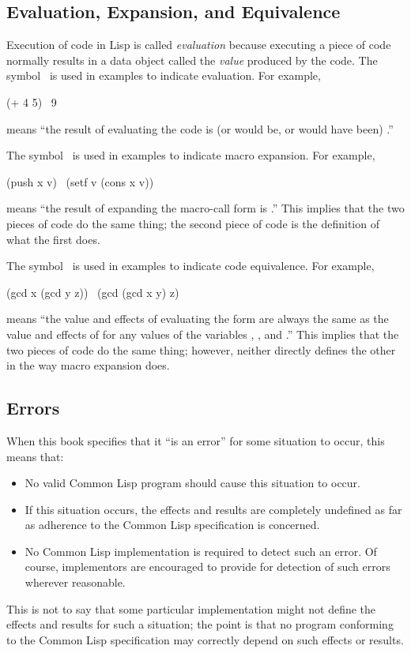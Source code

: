 \subsection{Evaluation, Expansion, and Equivalence}

Execution of code in Lisp is called \emph{evaluation} because executing a
piece of code normally results in a data object called the \emph{value}
produced by the code.  The symbol \EV\ is used in examples to
indicate evaluation.
For example,
\begin{lisp}
(+ 4 5) \EV\ 9
\end{lisp}
means ``the result of evaluating the code  is (or would be,
or would have been) .'' 

The symbol \EX\ is used in examples to indicate macro expansion.
For example,
\begin{lisp}
(push x v) \EX\ (setf v (cons x v))
\end{lisp}
means ``the result of expanding the macro-call form 
is .''  This implies that the two pieces
of code do the same thing; the second piece of code is
the definition of what the first does.

The symbol \EQ\ is used in examples to indicate code equivalence.
For example,
\begin{lisp}
(gcd x (gcd y z)) \EQ\ (gcd (gcd x y) z)
\end{lisp}
means ``the value and effects of evaluating the form
 are always the same as the value
and effects of
 for any values of the
variables , , and .''
This implies that the two pieces
of code do the same thing; however, neither directly defines
the other in the way macro expansion does.

\subsection{Errors}
\label{INTRO-ERRORS}

When this book specifies that it ``is an error'' for some situation
to occur, this means that:

\begin{itemize}
\item No valid Common Lisp program should cause this situation to occur.

\item If this situation occurs, the effects and results are completely
undefined as far as adherence to the Common Lisp specification is concerned.

\item No Common Lisp implementation is required to detect such an error.
Of course, implementors are encouraged to provide for detection
of such errors wherever reasonable.
\end{itemize}
This is not to say that some particular implementation might not define
the effects and results for such a situation; the point is that no program
conforming to the Common Lisp specification may correctly depend on such
effects or results.


